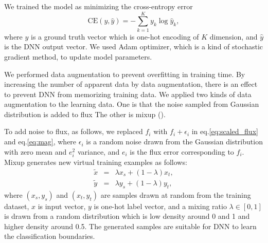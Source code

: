 \documentclass[useamsfonts]{pasj01}
\begin{document}
We trained the model as minimizing the cross-entropy error 
\begin{equation}
\mathrm{CE} \left(y, \hat{y} \right) =　-\sum_{k = 1}^K y_k \log \hat{y}_k,
\end{equation}
where $y$ is a ground truth vector which is one-hot encoding of $K$ dimension, and $\hat{y}$ is the DNN output vector.
We used Adam optimizer, which is a kind of stochastic gradient method, to update model parameters.

We performed data augmentation to prevent overfitting in training time.
By increasing the number of apparent data by data augmentation, there is an effect to prevent DNN from memorizing training data.
We applied two kinds of data augmentation to the learning data.
One is that the noise sampled from Gaussian distribution is added to flux
The other is mixup (\cite{mixup}).

To add noise to flux, as follows, we replaced $f_i$ with $f_i + \epsilon_i$ in eq.\ref{eq:scaled_flux} and eq.\ref{eq:mag},
where $\epsilon_i$ is a random noise drawn from the Gaussian distribution with zero mean and $e_i^2$ variance, and $e_i$ is the flux error corresponding to $f_i$.
Mixup generates new virtual training examples as follows:
\begin{eqnarray*}
    \tilde{x} &=& \lambda x_s + \left( 1-\lambda \right) x_t, \\
    \tilde{y} &=& \lambda y_s + \left( 1-\lambda \right) y_t,
\end{eqnarray*}
where $\left(x_s, y_s\right)$ and $\left(x_t, y_t\right)$ are samples drawn at random from the training dataset, $x$ is input vector, $y$ is one-hot label vector, and a mixing ratio $\lambda \in \left[0, 1\right]$ is drawn from a random distribution which is low density around 0 and 1 and higher density around 0.5. 
The generated samples are suitable for DNN to learn the classification boundaries.
\end{document}
